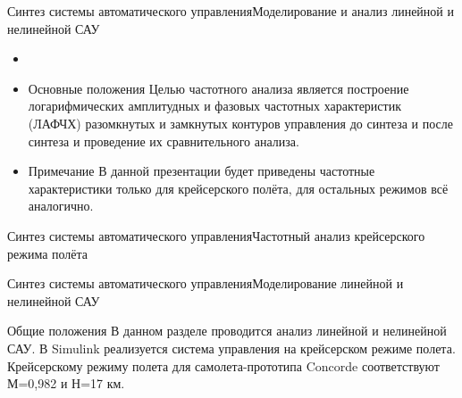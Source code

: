 \begin{frame}{Синтез системы автоматического управления}{Моделирование и анализ линейной и нелинейной САУ}
    \begin{itemize}
        \item <+-> []
        \item <+-> []
    \begin{block}{Основные положения}
        Целью частотного анализа является построение логарифмических амплитудных и фазовых частотных характеристик (ЛАФЧХ) 
        разомкнутых и замкнутых контуров управления до синтеза и после синтеза и проведение их сравнительного анализа.
    \end{block}
    \item <+-> []
    \begin{block}{Примечание}
        В данной презентации будет приведены частотные характеристики только для крейсерского полёта, 
        для остальных режимов всё аналогично.
    \end{block}
\end{itemize}
\end{frame}

\begin{frame}{Синтез системы автоматического управления}{Частотный анализ крейсерского режима полёта}
\end{frame}

\begin{frame}{Синтез системы автоматического управления}{Моделирование линейной и нелинейной САУ}
    \begin{block}{Общие положения}
        В данном разделе проводится анализ линейной и нелинейной САУ. В Simulink реализуется система управления на 
        крейсерском режиме полета. Крейсерскому режиму полета для самолета-прототипа Concorde соответствуют 
        М=0,982 и Н=17 км. 
    \end{block}
\end{frame}

